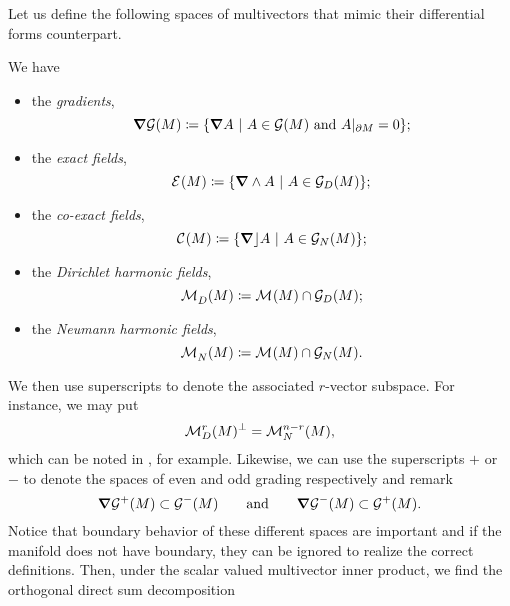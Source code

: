 Let us define the following spaces of multivectors that mimic their differential forms counterpart.
\begin{definition}
\label{def:differential_spaces}
We have
\begin{itemize}
    \item the \emph{gradients},
    \begin{equation}
    \boldsymbol{\nabla} \mathcal{G}(M) \coloneqq \{ \boldsymbol{\nabla} A ~\vert~ A \in \mathcal{G}(M) \textrm{~and~} A\vert_{\partial M} = 0\};
    \end{equation}
    \item the \emph{exact fields},
    \begin{equation}
        \mathcal{E}^{}(M)\coloneqq \{\boldsymbol{\nabla} \wedge A ~\vert~ A \in \mathcal{G}_D(M)\};
    \end{equation}
    \item the \emph{co-exact fields},
    \begin{equation}
        \mathcal{C}^{}(M)\coloneqq \{\boldsymbol{\nabla} \rfloor A ~\vert~ A \in \mathcal{G}_N(M)\};
    \end{equation}
    \item the \emph{Dirichlet harmonic fields},
    \begin{equation}
        \mathcal{M}^{}_D(M)\coloneqq \mathcal{M}^{}(M) \cap \mathcal{G}_D(M);
    \end{equation}
    \item the \emph{Neumann harmonic fields},
    \begin{equation}
        \mathcal{M}^{}_N(M)\coloneqq \mathcal{M}^{}(M) \cap \mathcal{G}_N(M).
    \end{equation}
\end{itemize}
\end{definition}
We then use superscripts to denote the associated $r$-vector subspace. For instance, we may put
\begin{equation}
\mathcal{M}^{r}_D(M)^\perp = \mathcal{M}^{n-r}_N(M),
\end{equation}
which can be noted in \cite{belishev_dirichlet_2008}, for example. Likewise, we can use the superscripts $+$ or $-$ to denote the spaces of even and odd grading respectively and remark
\begin{equation}
\boldsymbol{\nabla} \mathcal{G}^+(M) \subset \mathcal{G}^-(M) \qquad \textrm{and} \qquad \boldsymbol{\nabla} \mathcal{G}^-(M) \subset \mathcal{G}^+(M).
\end{equation}
Notice that boundary behavior of these different spaces are important and if the manifold does not have boundary, they can be ignored to realize the correct definitions. Then, under the scalar valued multivector inner product, we find the orthogonal direct sum decomposition
